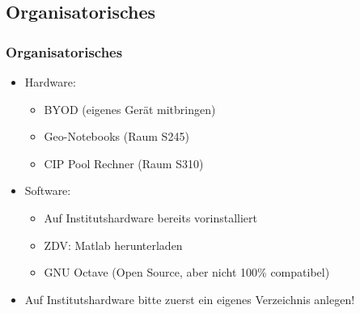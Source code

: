     \subsection{Organisatorisches}
    \begin{frame}
        \frametitle{Organisatorisches}

        \vspace{-1.0cm}

        \begin{itemize}
          \item Hardware:

          \begin{itemize}
            \itemsep0.3cm
            \item BYOD (eigenes Gerät mitbringen)
            \item Geo-Notebooks (Raum S245)
            \item CIP Pool Rechner (Raum S310)
          \end{itemize}

          \item Software:

          \begin{itemize}
            \itemsep0.3cm
            \item Auf Institutshardware bereits vorinstalliert
            \item ZDV: Matlab \href{https://services.zdv.uni-tuebingen.de/CampusSoftware/}{} herunterladen
            \item GNU Octave \href{https://www.gnu.org/software/octave/}{} (Open Source, aber nicht 100\% compatibel)
          \end{itemize}

          \item \alert{Auf Institutshardware bitte zuerst ein eigenes Verzeichnis anlegen!}

        \end{itemize}
    \end{frame}


